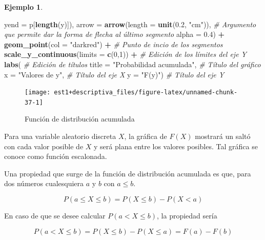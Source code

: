 \documentclass[
  11pt,
]{book}
\newenvironment{Shaded}{\begin{snugshade}}{\end{snugshade}}
\newcommand{\AttributeTok}[1]{\textcolor[rgb]{0.13,0.29,0.53}{#1}}
\newcommand{\CommentTok}[1]{\textcolor[rgb]{0.56,0.35,0.01}{\textit{#1}}}
\newcommand{\DecValTok}[1]{\textcolor[rgb]{0.00,0.00,0.81}{#1}}
\newcommand{\FloatTok}[1]{\textcolor[rgb]{0.00,0.00,0.81}{#1}}
\newcommand{\FunctionTok}[1]{\textcolor[rgb]{0.13,0.29,0.53}{\textbf{#1}}}
\newcommand{\NormalTok}[1]{#1}
\newcommand{\SpecialCharTok}[1]{\textcolor[rgb]{0.81,0.36,0.00}{\textbf{#1}}}
\newcommand{\StringTok}[1]{\textcolor[rgb]{0.31,0.60,0.02}{#1}}
\theoremstyle{definition}
\theoremstyle{definition}
\newtheorem{example}{Ejemplo}[chapter]
\theoremstyle{definition}
\theoremstyle{definition}
\theoremstyle{remark}
\begin{document}
\begin{example}
\begin{Shaded}
\begin{Highlighting}[]
        \AttributeTok{yend =}\NormalTok{ p[}\FunctionTok{length}\NormalTok{(y)]),}
    \AttributeTok{arrow =} \FunctionTok{arrow}\NormalTok{(}\AttributeTok{length =} \FunctionTok{unit}\NormalTok{(}\FloatTok{0.2}\NormalTok{, }\StringTok{"cm"}\NormalTok{)), }\CommentTok{\# Argumento que permite dar la forma de flecha al último segmento}
    \AttributeTok{alpha =} \FloatTok{0.4}\NormalTok{) }\SpecialCharTok{+}
  \FunctionTok{geom\_point}\NormalTok{(}\AttributeTok{col =} \StringTok{"darkred"}\NormalTok{) }\SpecialCharTok{+} \CommentTok{\# Punto de incio de los segmentos}
  \FunctionTok{scale\_y\_continuous}\NormalTok{(}\AttributeTok{limits =} \FunctionTok{c}\NormalTok{(}\DecValTok{0}\NormalTok{,}\DecValTok{1}\NormalTok{)) }\SpecialCharTok{+} \CommentTok{\# Edición de los límites del eje Y}
  \FunctionTok{labs}\NormalTok{( }\CommentTok{\# Edición de títulos}
    \AttributeTok{title =} \StringTok{"Probabilidad acumulada"}\NormalTok{, }\CommentTok{\# Título del gráfico}
    \AttributeTok{x =} \StringTok{"Valores de y"}\NormalTok{, }\CommentTok{\# Título del eje X}
    \AttributeTok{y =} \StringTok{"F(y)"}\NormalTok{) }\CommentTok{\# Título del eje Y}
\end{Highlighting}
\end{Shaded}

\begin{figure}

{\centering \texttt{[image: est1+descriptiva\_files/figure-latex/unnamed-chunk-37-1]} 

}

\caption{Función de distribución acumulada}\label{fig:unnamed-chunk-37}
\end{figure}

Para una variable aleatorio discreta \(X\), la gráfica de \(F(X)\) mostrará un saltó con cada valor posible de \(X\) y será plana entre los valores posibles. Tal gráfica se conoce como función escalonada.
\end{example}

Una propiedad que surge de la función de distribución acumulada es que, para dos números cualesquiera \(a\) y \(b\) con \(a\leq b\).

\begin{equation}
P(a\leq X \leq b) = P(X \leq b) - P(X < a)
\label{eq:fda2}
\end{equation}

En caso de que se desee calcular \(P(a < X \leq b)\), la propiedad sería

\begin{equation}
P(a < X \leq b) = P(X \leq b) - P(X \leq a) = F(a) - F(b)
\label{eq:fda3}
\end{equation}
\end{document}
